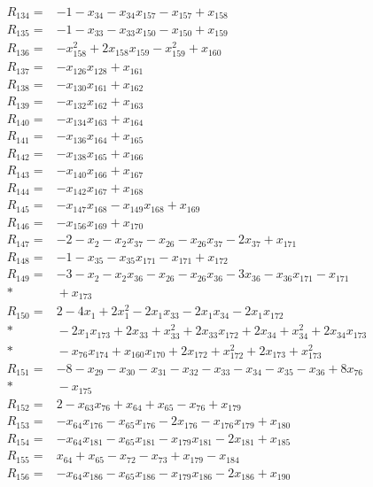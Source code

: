 \begin{align*}
R_{134}={}&-1-x_{34}-x_{34}x_{157}-x_{157}+x_{158}\\[3pt]
R_{135}={}&-1-x_{33}-x_{33}x_{150}-x_{150}+x_{159}\\[3pt]
R_{136}={}&-x_{158}^{2}+2x_{158}x_{159}-x_{159}^{2}+x_{160}\\[3pt]
R_{137}={}&-x_{126}x_{128}+x_{161}\\[3pt]
R_{138}={}&-x_{130}x_{161}+x_{162}\\[3pt]
R_{139}={}&-x_{132}x_{162}+x_{163}\\[3pt]
R_{140}={}&-x_{134}x_{163}+x_{164}\\[3pt]
R_{141}={}&-x_{136}x_{164}+x_{165}\\[3pt]
R_{142}={}&-x_{138}x_{165}+x_{166}\\[3pt]
R_{143}={}&-x_{140}x_{166}+x_{167}\\[3pt]
R_{144}={}&-x_{142}x_{167}+x_{168}\\[3pt]
R_{145}={}&-x_{147}x_{168}-x_{149}x_{168}+x_{169}\\[3pt]
R_{146}={}&-x_{156}x_{169}+x_{170}\\[3pt]
R_{147}={}&-2-x_{2}-x_{2}x_{37}-x_{26}-x_{26}x_{37}-2x_{37}+x_{171}\\[3pt]
R_{148}={}&-1-x_{35}-x_{35}x_{171}-x_{171}+x_{172}\\[3pt]
R_{149}={}&-3-x_{2}-x_{2}x_{36}-x_{26}-x_{26}x_{36}-3x_{36}-x_{36}x_{171}-x_{171}\\*
&{}+x_{173}\\[3pt]
R_{150}={}&2-4x_{1}+2x_{1}^{2}-2x_{1}x_{33}-2x_{1}x_{34}-2x_{1}x_{172}\\*
&{}-2x_{1}x_{173}+2x_{33}+x_{33}^{2}+2x_{33}x_{172}+2x_{34}+x_{34}^{2}+2x_{34}x_{173}\\*
&{}-x_{76}x_{174}+x_{160}x_{170}+2x_{172}+x_{172}^{2}+2x_{173}+x_{173}^{2}\\[3pt]
R_{151}={}&-8-x_{29}-x_{30}-x_{31}-x_{32}-x_{33}-x_{34}-x_{35}-x_{36}+8x_{76}\\*
&{}-x_{175}\\[3pt]
R_{152}={}&2-x_{63}x_{76}+x_{64}+x_{65}-x_{76}+x_{179}\\[3pt]
R_{153}={}&-x_{64}x_{176}-x_{65}x_{176}-2x_{176}-x_{176}x_{179}+x_{180}\\[3pt]
R_{154}={}&-x_{64}x_{181}-x_{65}x_{181}-x_{179}x_{181}-2x_{181}+x_{185}\\[3pt]
R_{155}={}&x_{64}+x_{65}-x_{72}-x_{73}+x_{179}-x_{184}\\[3pt]
R_{156}={}&-x_{64}x_{186}-x_{65}x_{186}-x_{179}x_{186}-2x_{186}+x_{190}\\[3pt]

\end{align*}
